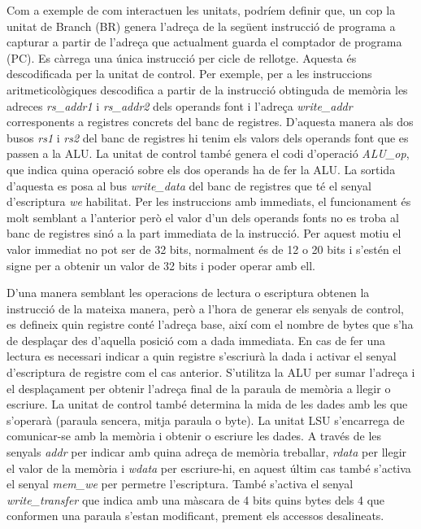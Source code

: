\documentclass[10pt,a4paper,twocolumn,twoside]{article}
\begin{document}
    Com a exemple de com interactuen les unitats, podríem definir que, un cop la unitat de Branch (BR) genera l’adreça de la següent instrucció de programa a capturar a partir de l'adreça que actualment guarda el comptador de programa (PC). 
    Es càrrega una única instrucció per cicle de rellotge. Aquesta és descodificada per la unitat de control. 
    Per exemple, per a les instruccions aritmeticològiques descodifica a partir de la instrucció obtinguda de memòria les adreces \textit{rs\_addr1} i \textit{rs\_addr2} dels operands font i l’adreça \textit{write\_addr} corresponents a registres concrets del banc de registres. 
    D’aquesta manera als dos busos \textit{rs1} i \textit{rs2} del banc de registres hi tenim els valors dels operands font que es passen a la ALU. La unitat de control també genera el codi d’operació \textit{ALU\_op}, que indica quina operació sobre els dos operands ha de fer la ALU. 
    La sortida d’aquesta es posa al bus \textit{write\_data} del banc de registres que té el senyal d’escriptura \textit{we} habilitat. 
    Per les instruccions amb immediats, el funcionament és molt semblant a l’anterior però el valor d’un dels operands fonts no es troba al banc de registres sinó a la part immediata de la instrucció. Per aquest motiu el valor immediat no pot ser de 32 bits, normalment és de 12 o 20 bits i s'estén el signe per a obtenir un valor de 32 bits i poder operar amb ell.

    
    D'una manera semblant les operacions de lectura o escriptura obtenen la instrucció de la mateixa manera, però a l'hora de generar els senyals de control, es defineix quin registre conté l'adreça base, així com el nombre de bytes que s'ha de desplaçar des d'aquella posició com a dada immediata. En cas de fer una lectura es necessari indicar a quin registre s'escriurà la dada i activar el senyal d'escriptura de registre com el cas anterior. S'utilitza la ALU per sumar l'adreça i el desplaçament per obtenir l'adreça final de la paraula de memòria a llegir o escriure. La unitat de control també determina la mida de les dades amb les que s'operarà (paraula sencera, mitja paraula o byte). La unitat LSU s'encarrega de comunicar-se amb la memòria i obtenir o escriure les dades. A través de les senyals \textit{addr} per indicar amb quina adreça de memòria treballar, \textit{rdata} per llegir el valor de la memòria i \textit{wdata} per escriure-hi, en aquest últim cas també s'activa el senyal \textit{mem\_we} per permetre l'escriptura. També s'activa el senyal \textit{write\_transfer} que indica amb una màscara de 4 bits quins bytes dels 4 que conformen una paraula s'estan modificant, prement els accessos desalineats.
    
\end{document}
